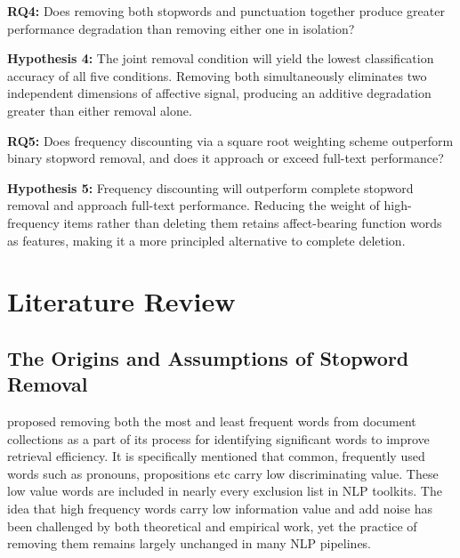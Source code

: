\documentclass[a4paper,10pt]{article}
\begin{document}
\medskip

\noindent\textbf{RQ4:} Does removing both stopwords and punctuation together produce greater performance degradation than removing either one in isolation?

\noindent\textbf{Hypothesis 4:} The joint removal condition will yield the lowest classification accuracy of all five conditions. Removing both simultaneously eliminates two independent dimensions of affective signal, producing an additive degradation greater than either removal alone.

\medskip

\noindent\textbf{RQ5:} Does frequency discounting via a square root weighting scheme outperform binary stopword removal, and does it approach or exceed full-text performance?

\noindent\textbf{Hypothesis 5:} Frequency discounting will outperform complete stopword removal and approach full-text performance. Reducing the weight of high-frequency items rather than deleting them retains affect-bearing function words as features, making it a more principled alternative to complete deletion.

\section{Literature Review}
\subsection{The Origins and Assumptions of Stopword Removal}
 \citet{luhn1958automatic} proposed removing both the most and least frequent words from document collections as a part of its process for identifying significant words to improve retrieval efficiency. It is specifically mentioned that common, frequently used words such as pronouns, propositions etc carry low discriminating value. These low value words are included in nearly every exclusion list in NLP toolkits. The idea that high frequency words carry low information value and add noise has been challenged by both theoretical and empirical work, yet the practice of removing them remains largely unchanged in many NLP pipelines.
\end{document}
